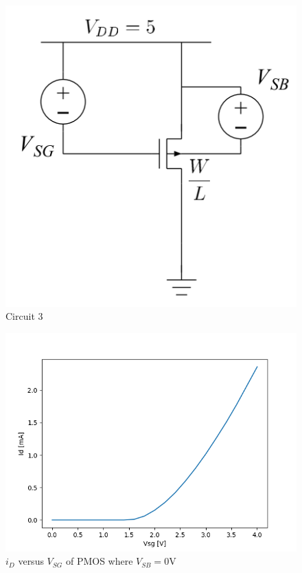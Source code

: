 
\FloatBarrier

\begin{figure}[h!]
	\centering
	\includegraphics[scale=0.75]{./images/circuit_3.PNG}
	\caption{Circuit 3}
	\label{fig:circuit_3}
\end{figure}

\FloatBarrier

\FloatBarrier

\begin{figure}[h!]
	\centering
	\includegraphics[scale=0.75]{./images/data_3.PNG}
	\caption{$i_{D}$ versus $V_{SG}$ of PMOS where $V_{SB}= 0$\si{\volt}}
	\label{fig:data_3}
\end{figure}

